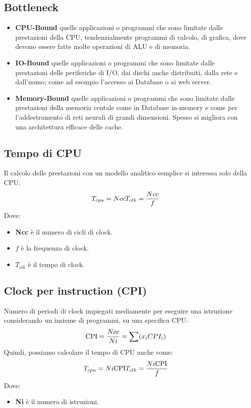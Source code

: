 \documentclass{article}
\begin{document}
\subsection{Bottleneck}
\begin{itemize}
    \item \textbf{CPU-Bound} quelle applicazioni o programmi che sono limitate dalle prestazioni della CPU, tendenzialmente programmi di calcolo, di grafica, dove devono essere fatte molte operazioni di ALU e di memoria.
    \item \textbf{IO-Bound} quelle applicazioni o programmi che sono limitate dalle prestazioni delle periferiche di I/O, dai dischi anche distribuiti, dalla rete e dall’uomo; come ad esempio l’accesso ai Database o ai web server.
    \item \textbf{Memory-Bound} quelle applicazioni o programmi che sono limitate dalle prestazioni della memoria centale come in Database in-memory e come per l’addestramento di reti neurali di grandi dimensioni. Spesso si migliora con una architettura efficace delle cache.
\end{itemize}

\subsection{Tempo di CPU}
Il calcolo delle prestazioni con un modello analitico semplice si interessa solo della CPU:
\[T_{cpu} = Ncc \space\space T_{clk} = \frac{Ncc}{f}\] 
Dove: 
\begin{itemize}
    \item \textbf{Ncc} è il numero di cicli di clock.
    \item \textbf{$f$} è la frequenza di clock.
    \item \textbf{$T_{clk}$} è il tempo di clock.
\end{itemize}

\subsection{Clock per instruction (CPI)}
Numero di periodi di clock impiegati mediamente per eseguire una istruzione considerando un insieme di programmi, su una specifica CPU:
\[\text{CPI} = \frac{Ncc}{Ni} = \sum(x_i \space CPI_i)\]
Quindi, possiamo calcolare il tempo di CPU anche come:
\[T_{cpu} = Ni \space\space \text{CPI} \space\space T_{clk} = \frac{Ni \space\space \text{CPI}}{f} \]
Dove:
\begin{itemize}
    \item \textbf{Ni} è il numero di istruzioni.
\end{itemize}
\end{document}
